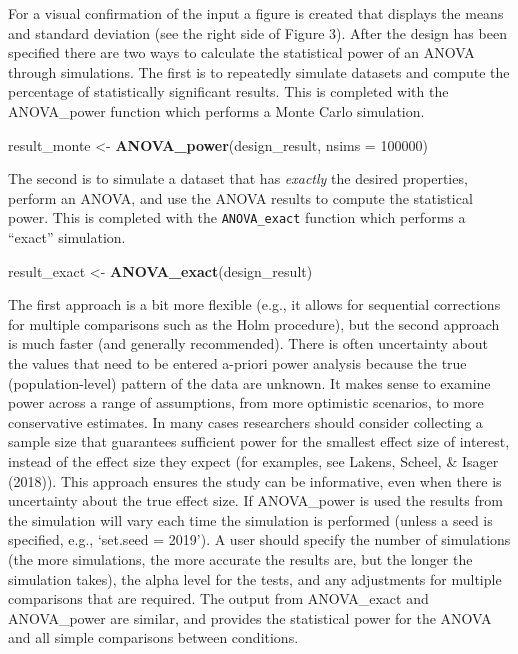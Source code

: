 \documentclass[
  ,jou,floatsintext]{apa6}
\newenvironment{Shaded}{\begin{snugshade}}{\end{snugshade}}
\newcommand{\DataTypeTok}[1]{\textcolor[rgb]{0.13,0.29,0.53}{#1}}
\newcommand{\DecValTok}[1]{\textcolor[rgb]{0.00,0.00,0.81}{#1}}
\newcommand{\KeywordTok}[1]{\textcolor[rgb]{0.13,0.29,0.53}{\textbf{#1}}}
\newcommand{\NormalTok}[1]{#1}
\newcommand{\StringTok}[1]{\textcolor[rgb]{0.31,0.60,0.02}{#1}}
\begin{document}
For a visual confirmation of the input a figure is created that displays the means and standard deviation (see the right side of Figure 3).
After the design has been specified there are two ways to calculate the statistical power of an ANOVA through simulations.
The first is to repeatedly simulate datasets and compute the percentage of statistically significant results. This is completed with the ANOVA\_power function which performs a Monte Carlo simulation.

\begin{Shaded}
\begin{Highlighting}[]
\NormalTok{result_monte <-}\StringTok{ }\KeywordTok{ANOVA_power}\NormalTok{(design_result, }
                            \DataTypeTok{nsims =} \DecValTok{100000}\NormalTok{)}
\end{Highlighting}
\end{Shaded}

The second is to simulate a dataset that has \emph{exactly} the desired properties, perform an ANOVA, and use the ANOVA results to compute the statistical power. This is completed with the \texttt{ANOVA\_exact} function which performs a \enquote{exact} simulation.

\begin{Shaded}
\begin{Highlighting}[]
\NormalTok{result_exact <-}\StringTok{ }\KeywordTok{ANOVA_exact}\NormalTok{(design_result)}
\end{Highlighting}
\end{Shaded}

The first approach is a bit more flexible (e.g., it allows for sequential corrections for multiple comparisons such as the Holm procedure), but the second approach is much faster (and generally recommended).
There is often uncertainty about the values that need to be entered a-priori power analysis because the true (population-level) pattern of the data are unknown.
It makes sense to examine power across a range of assumptions, from more optimistic scenarios, to more conservative estimates.
In many cases researchers should consider collecting a sample size that guarantees sufficient power for the smallest effect size of interest, instead of the effect size they expect (for examples, see Lakens, Scheel, \& Isager (2018)).
This approach ensures the study can be informative, even when there is uncertainty about the true effect size.
If ANOVA\_power is used the results from the simulation will vary each time the simulation is performed (unless a seed is specified, e.g., `set.seed = 2019').
A user should specify the number of simulations (the more simulations, the more accurate the results are, but the longer the simulation takes), the alpha level for the tests, and any adjustments for multiple comparisons that are required.
The output from ANOVA\_exact and ANOVA\_power are similar, and provides the statistical power for the ANOVA and all simple comparisons between conditions.
\end{document}
